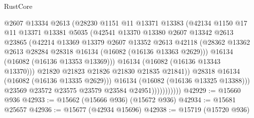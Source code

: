 \begin{lexlean}{RustCore}
\begin{coremodule}
                              @2607
                              @13334
                              @2613
                              (@28230
                                @1151
                                @11
                                @13371
                                @13383
                                (@42134
                                  @1150
                                  @17
                                  @11
                                  @13371
                                  @13381
                                  @5035
                                  (@42541
                                    @13370
                                    @13380
                                    @2607
                                    @13342
                                    @2613
                                    @23865
                                    (@42214
                                      @13369
                                      @13379
                                      @2607
                                      @13352
                                      @2613
                                      @42118
                                      (@28362
                                        @13362
                                        @2613
                                        @28284
                                        @28318
                                        @16134
                                        (@16082 (@16136 @13363 @2629)))
                                      @16134
                                      (@16082 (@16136 @13353 @13369)))
                                    @16134
                                    (@16082 (@16136 @13343 @13370)))
                                  @21820
                                  @21823
                                  @21826
                                  @21830
                                  @21835
                                  @21841))
                              @28318
                              @16134
                              (@16082 (@16136 @13335 @2629)))
                            @16134
                            (@16082 (@16136 @13325 @13388)))
                          @23569
                          @23572
                          @23575
                          @23579
                          @23584
                          @24951)))))))))))
@42929 := @15660 @936
@42933 := @15662 (@15666 @936) (@15672 @936)
@42934 := @15681 @25657
@42936 := @15677 (@42934 @15696)
@42938 := @15719 (@15720 @936)

\end{coremodule}
\end{lexlean}
